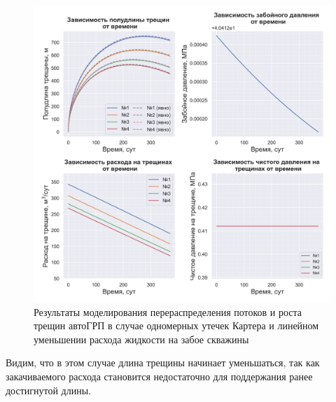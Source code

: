 \begin{figure}[H] 
\center
\includegraphics[width=\linewidth]{images/myimage5.jpg}
\caption{Результаты моделирования перераспределения потоков и роста трещин автоГРП в случае одномерных утечек Картера и линейном уменьшении расхода жидкости на забое скважины}
\label{fig:myimage5}
\end{figure}

Видим, что в этом случае длина трещины начинает уменьшаться, так как закачиваемого расхода становится недостаточно для поддержания ранее достигнутой длины.

